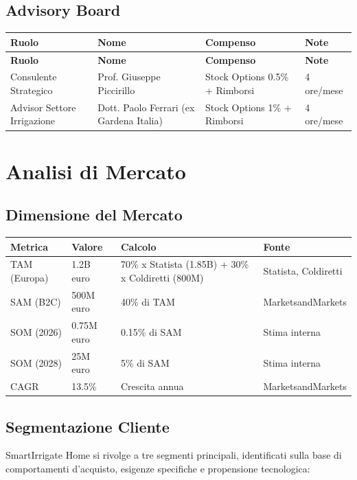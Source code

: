 \documentclass[11pt,a4paper]{report}
\begin{document}
\section{Advisory Board}
\begin{longtable}{|L{2.5cm}|L{3.5cm}|L{2.5cm}|L{2cm}|}
\hline
{\bf Ruolo} & {\bf Nome} & {\bf Compenso} & {\bf Note} \\
\hline
\endfirsthead
\hline
{\bf Ruolo} & {\bf Nome} & {\bf Compenso} & {\bf Note} \\
\hline
\endhead
\endfoot
\endlastfoot
Consulente Strategico & Prof. Giuseppe Piccirillo & Stock Options 0.5\% + Rimborsi & 4 ore/mese \\
Advisor Settore Irrigazione & Dott. Paolo Ferrari (ex Gardena Italia) & Stock Options 1\% + Rimborsi & 4 ore/mese \\
\hline
\end{longtable}

\chapter{Analisi di Mercato}
\label{ch:market-analysis}

\section{Dimensione del Mercato}
\label{sec:market-size}
\begin{longtable}{|L{3cm}|C{2cm}|L{4.5cm}|L{4cm}|}
\hline
{\bf Metrica} & {\bf Valore} & {\bf Calcolo} & {\bf Fonte} \\ \hline
TAM (Europa) & 1.2B euro & 70\% x Statista (1.85B) + 30\% x Coldiretti (800M) & Statista, Coldiretti \\
SAM (B2C) & 500M euro & 40\% di TAM & MarketsandMarkets \\
SOM (2026) & 0.75M euro & 0.15\% di SAM & Stima interna \\
SOM (2028) & 25M euro & 5\% di SAM & Stima interna \\
CAGR & 13.5\% & Crescita annua & MarketsandMarkets \\ \hline
\end{longtable}

\section{Segmentazione Cliente}
SmartIrrigate Home si rivolge a tre segmenti principali, identificati sulla base di comportamenti d'acquisto, esigenze specifiche e propensione tecnologica:
\end{document}
